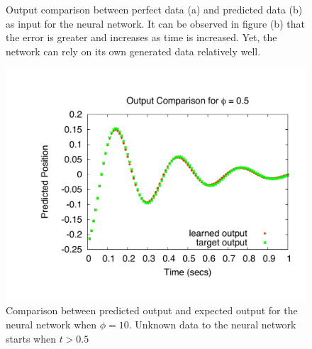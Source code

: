 \documentclass[11pt]{article}
\begin{document}
\begin{figure}[]
	\centering
		\caption{Output comparison between perfect data (a) and predicted data (b) as input for the neural network. It can be observed in figure (b) that the error is greater and increases as time is increased. Yet, the network can rely on its own generated data relatively well.}
	\label{fig:bpgt-3.0_damping_test_output_comp}	
\end{figure}

\begin{figure}[htbp]
	\centering
		\includegraphics[width=0.80\columnwidth]{../bpgt-3.0/damping_test/output_phi.pdf}
	\caption{Comparison between predicted output and expected output for the neural network when $\phi=10$. Unknown data to the neural network starts when $t > 0.5$}
	\label{fig:bpgt-3.0_damping_test_output_phi}
\end{figure}
\end{document}
